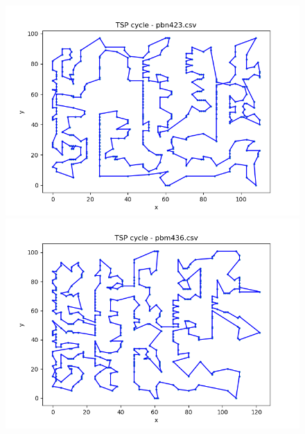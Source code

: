 \documentclass[12pt]{article}
\begin{document}
        \begin{figure}[h]
            \centering
            \includegraphics[width=0.8\linewidth]{img/pbn423.png}
            \label{fig:pbn423}
            \includegraphics[width=0.8\linewidth]{img/pbm436.png}
            \label{fig:pbm436}
        \end{figure}

        \newpage
\end{document}
